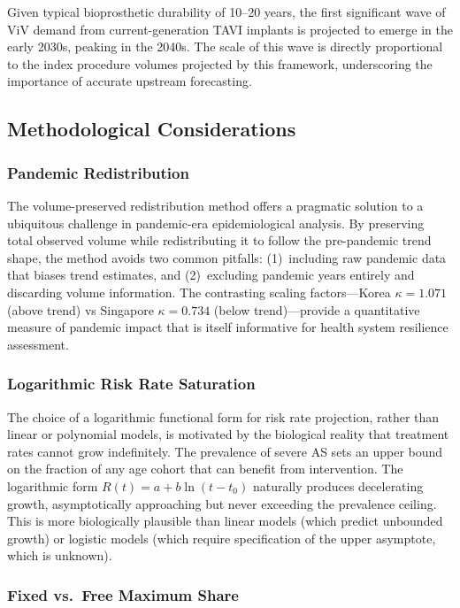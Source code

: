 \documentclass[12pt, a4paper]{article}
\begin{document}
Given typical bioprosthetic durability of 10--20 years, the first significant wave of ViV demand from current-generation TAVI implants is projected to emerge in the early 2030s, peaking in the 2040s. The scale of this wave is directly proportional to the index procedure volumes projected by this framework, underscoring the importance of accurate upstream forecasting.

\subsection{Methodological Considerations}

\subsubsection{Pandemic Redistribution}

The volume-preserved redistribution method offers a pragmatic solution to a ubiquitous challenge in pandemic-era epidemiological analysis. By preserving total observed volume while redistributing it to follow the pre-pandemic trend shape, the method avoids two common pitfalls: (1)~including raw pandemic data that biases trend estimates, and (2)~excluding pandemic years entirely and discarding volume information. The contrasting scaling factors---Korea $\kappa = 1.071$ (above trend) vs Singapore $\kappa = 0.734$ (below trend)---provide a quantitative measure of pandemic impact that is itself informative for health system resilience assessment.

\subsubsection{Logarithmic Risk Rate Saturation}

The choice of a logarithmic functional form for risk rate projection, rather than linear or polynomial models, is motivated by the biological reality that treatment rates cannot grow indefinitely. The prevalence of severe AS sets an upper bound on the fraction of any age cohort that can benefit from intervention. The logarithmic form $R(t) = a + b \ln(t - t_0)$ naturally produces decelerating growth, asymptotically approaching but never exceeding the prevalence ceiling. This is more biologically plausible than linear models (which predict unbounded growth) or logistic models (which require specification of the upper asymptote, which is unknown).

\subsubsection{Fixed vs.\ Free Maximum Share}
\end{document}
